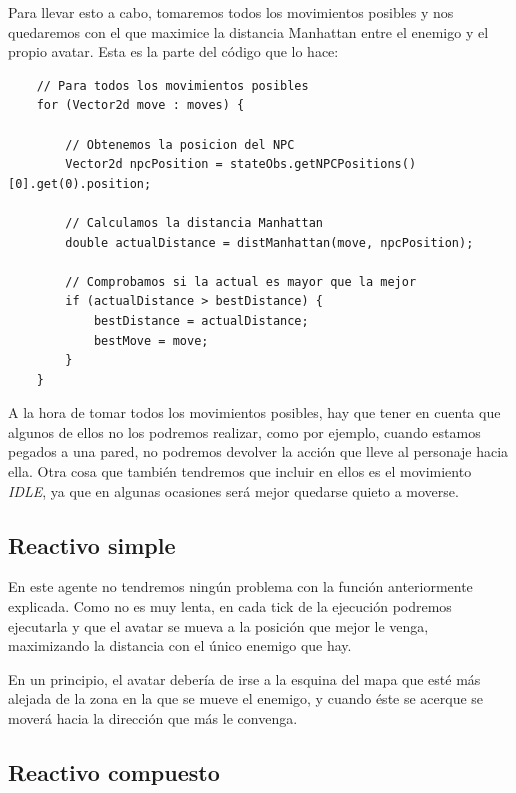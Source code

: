 \documentclass[11pt,a4paper]{article}
\begin{document}
Para llevar esto a cabo, tomaremos todos los movimientos posibles y nos quedaremos con el que maximice la
distancia Manhattan entre el enemigo y el propio avatar. Esta es la parte del código que lo hace:
\newline
\begin{lstlisting}
    // Para todos los movimientos posibles
    for (Vector2d move : moves) {
    
        // Obtenemos la posicion del NPC
        Vector2d npcPosition = stateObs.getNPCPositions()[0].get(0).position;
    
        // Calculamos la distancia Manhattan
        double actualDistance = distManhattan(move, npcPosition);
        
        // Comprobamos si la actual es mayor que la mejor
        if (actualDistance > bestDistance) {
            bestDistance = actualDistance;
            bestMove = move;
        }
    }
\end{lstlisting}

A la hora de tomar todos los movimientos posibles, hay que tener en cuenta que algunos de ellos no los
podremos realizar, como por ejemplo, cuando estamos pegados a una pared, no podremos devolver la acción que
lleve al personaje hacia ella. Otra cosa que también tendremos que incluir en ellos es el movimiento
\textit{IDLE}, ya que en algunas ocasiones será mejor quedarse quieto a moverse.


\subsection{Reactivo simple}

En este agente no tendremos ningún problema con la función anteriormente explicada. Como no es muy lenta, en
cada tick de la ejecución podremos ejecutarla y que el avatar se mueva a la posición que mejor le venga,
maximizando la distancia con el único enemigo que hay.

En un principio, el avatar debería de irse a la esquina del mapa que esté más alejada de la zona en la que
se mueve el enemigo, y cuando éste se acerque se moverá hacia la dirección que más le convenga.


\subsection{Reactivo compuesto}
\end{document}
